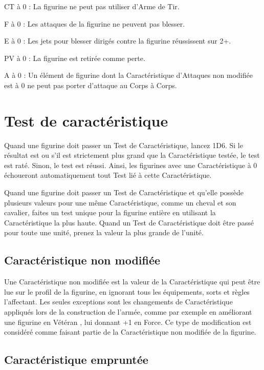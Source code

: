 \noindent CT à 0 : La figurine ne peut pas utiliser d'Arme de Tir.

\noindent F à 0 : Les attaques de la figurine ne peuvent pas blesser.

\noindent E à 0 : Les jets pour blesser dirigés contre la figurine réussissent sur 2+.

\noindent PV à 0 : La figurine est retirée comme perte.

\noindent A à 0 : Un élément de figurine dont la Caractéristique d'Attaques non modifiée est à 0 ne peut pas porter d'attaque au Corps à Corps.

\section{Test de caractéristique}

Quand une figurine doit passer un Test de Caractéristique, lancez 1D6. Si le résultat est  ou s'il est strictement plus grand que la Caractéristique testée, le test est raté. Sinon, le test est réussi. Ainsi, les figurines avec une Caractéristique à 0 échoueront automatiquement tout Test lié à cette Caractéristique.

Quand une figurine doit passer un Test de Caractéristique et qu'elle possède plusieurs valeurs pour une même Caractéristique, comme un cheval et son cavalier, faites un test unique pour la figurine entière en utilisant la Caractéristique la plus haute. Quand un Test de Caractéristique doit être passé pour toute une unité, prenez la valeur la plus grande de l'unité.

\subsection{Caractéristique non modifiée}

Une Caractéristique non modifiée est la valeur de la Caractéristique qui peut être lue sur le profil de la figurine, en ignorant tous les équipements, sorts et règles l'affectant. Les seules exceptions sont les changements de Caractéristique appliqués lors de la construction de l'armée, comme par exemple en améliorant une figurine en \og Vétéran \fg{}, lui donnant +1 en Force. Ce type de modification est considéré comme faisant partie de la Caractéristique non modifiée de la figurine.

\subsection{Caractéristique empruntée}

